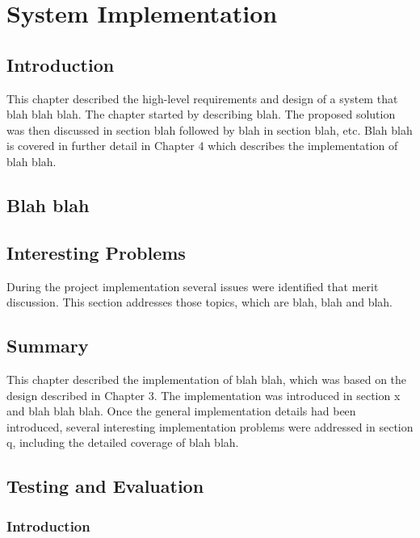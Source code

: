 \chapter{System Implementation}

\section{Introduction} \label{s-i--introduction}

This chapter described the high-level requirements and design of a system that blah blah blah.  The chapter started by describing blah.  The proposed solution was then discussed in section blah followed by blah in section blah, etc. 
Blah blah is covered in further detail in Chapter 4 which describes the implementation of blah blah.

\section{Blah blah}

\section{Interesting Problems} \label{s-i--interesting-problems}

During the project implementation several issues were identified that merit discussion. This section addresses those topics, which are blah, blah and blah.

\section{Summary} \label{s-i--summary}

This chapter described the implementation of blah blah, which was based on the design described in Chapter 3. The implementation was introduced in section x and blah blah blah.  Once the general implementation details had been introduced, several interesting implementation problems were addressed in section q, including the detailed coverage of blah blah.

\section{Testing and Evaluation} \label{s-i--testing-and-evaluation}

\subsection{Introduction}

